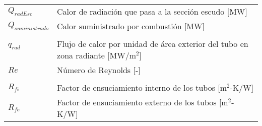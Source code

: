 \begin{tabular}{ll}
$Q_{radEsc}$& Calor de radiación que pasa a la sección escudo [MW] \\
$Q_{suministrado}$ & Calor suministrado por combustión [MW] \\
\\
$q_{rad}$ & \multirow{2}{26em}{Flujo de calor por unidad de área exterior del tubo en zona radiante [MW/m$^2$]} \\
\\
$Re$    & Número de Reynolds [-]\\
\\
$R_{fi}$  & Factor de ensuciamiento interno de los tubos [m$^2$-K/W] \\
$R_{fe}$  & Factor de ensuciamiento externo de los tubos [m$^2$-K/W] \\
\end{tabular}


